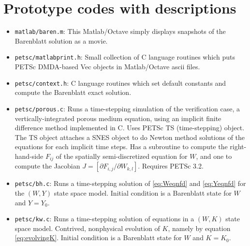 \documentclass[11pt]{amsart}
\begin{document}
\section{Prototype codes with descriptions} \label{app:prototypes}

\begin{itemize}
\item \texttt{matlab/baren.m}: \quad This Matlab/Octave simply displays snapshots of the Barenblatt solution as a movie.
\item \texttt{petsc/matlabprint.h}: \quad Small collection of C language routines which puts PETSc DMDA-based Vec objects in Matlab/Octave ascii files.
\item \texttt{petsc/context.h}: \quad C language routines which set default constants and compute the Barenblatt exact solution.
\item \texttt{petsc/porous.c}: \quad Runs a time-stepping simulation of the verification case, a vertically-integrated porous medium equation, using an implicit finite difference method implemented in C.  Uses PETSc TS (time-stepping) object.  The TS object attaches a SNES object to do Newton method solutions of the equations for each implicit time steps.  Has a subroutine to compute the right-hand-side $F_{ij}$ of the spatially semi-discretized equation for $W$, and one to compute the Jacobian $J=[\partial F_{i,j}/\partial W_{k,l}]$.  Requires PETSc 3.2.
\item \texttt{petsc/bh.c}: \quad Runs a time-stepping solution of \eqref{eq:Weqnfd} and \eqref{eq:Yeqnfd} for the $(W,Y)$ state space model.  Initial condition is a Barenblatt state for $W$ and $Y=Y_0$.
\item \texttt{petsc/kw.c}: \quad Runs a time-stepping solution of equations in a $(W,K)$ state space model.  Contrived, nonphysical evolution of $K$, namely by equation \eqref{eq:evolvingK}.  Initial condition is a Barenblatt state for $W$ and $K=K_0$.
\end{itemize}
\end{document}
